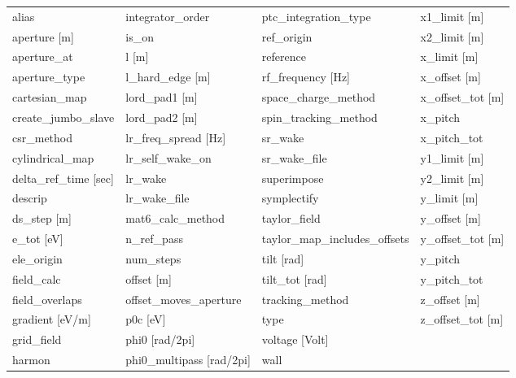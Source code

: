  \begin{tabular}{llll} \toprule
alias                          & integrator_order               & ptc_integration_type           & x1_limit [m]                   \\
aperture [m]                   & is_on                          & ref_origin                     & x2_limit [m]                   \\
aperture_at                    & l [m]                          & reference                      & x_limit [m]                    \\
aperture_type                  & l_hard_edge [m]                & rf_frequency [Hz]              & x_offset [m]                   \\
cartesian_map                  & lord_pad1 [m]                  & space_charge_method            & x_offset_tot [m]               \\
create_jumbo_slave             & lord_pad2 [m]                  & spin_tracking_method           & x_pitch                        \\
csr_method                     & lr_freq_spread [Hz]            & sr_wake                        & x_pitch_tot                    \\
cylindrical_map                & lr_self_wake_on                & sr_wake_file                   & y1_limit [m]                   \\
delta_ref_time [sec]           & lr_wake                        & superimpose                    & y2_limit [m]                   \\
descrip                        & lr_wake_file                   & symplectify                    & y_limit [m]                    \\
ds_step [m]                    & mat6_calc_method               & taylor_field                   & y_offset [m]                   \\
e_tot [eV]                     & n_ref_pass                     & taylor_map_includes_offsets    & y_offset_tot [m]               \\
ele_origin                     & num_steps                      & tilt [rad]                     & y_pitch                        \\
field_calc                     & offset [m]                     & tilt_tot [rad]                 & y_pitch_tot                    \\
field_overlaps                 & offset_moves_aperture          & tracking_method                & z_offset [m]                   \\
gradient [eV/m]                & p0c [eV]                       & type                           & z_offset_tot [m]               \\
grid_field                     & phi0 [rad/2pi]                 & voltage [Volt]                 &                                \\
harmon                         & phi0_multipass [rad/2pi]       & wall                           &                                \\
 \bottomrule
 \end{tabular}
 \vfill
 
